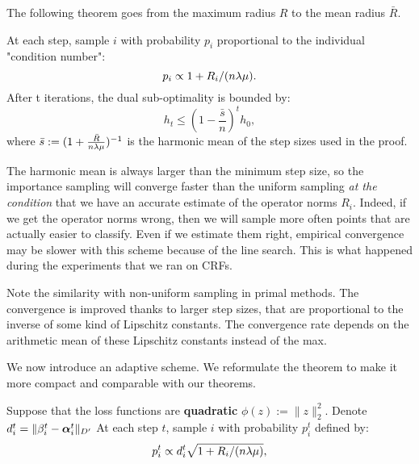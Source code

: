 \begin{subappendices}
	The following theorem goes from the maximum radius $R$ to the mean radius $\bar R$.
	
	\begin{theorem}
		\label{app:importance}
		At each step, sample $i$ with probability $p_i$ proportional to the individual "condition number":
		\begin{equation}
			p_i \propto 1+R_i/(n \lambda \mu).
		\end{equation}
		After t iterations, the dual sub-optimality is bounded by:
		\begin{equation}
			h_t \leq (1-\frac{\bar s}{n})^t  h_0,
		\end{equation}
		where $\bar s := (1 + \frac{\bar R}{n \lambda \mu})^{-1}$ is the harmonic mean of the step sizes used in the proof.
	\end{theorem}
	
	The harmonic mean is always larger than the minimum step size, so the importance sampling will converge faster than the uniform sampling \textit{at the condition} that we have an accurate estimate of the operator norms $R_i$.
	Indeed, if we get the operator norms wrong, then we will sample more often points that are actually easier to classify.
	Even if we estimate them right, empirical convergence may be slower with this scheme because of the line search.
	This is what happened during the experiments that we ran on CRFs.
	
	Note the similarity with non-uniform sampling in primal methods.
	The convergence is improved thanks to larger step sizes, that are proportional to the inverse of some kind of Lipschitz constants.
	The convergence rate depends on the arithmetic mean of these Lipschitz constants instead of the max.
	
	We now introduce an adaptive scheme. We reformulate the theorem to make it more compact and comparable with our theorems.
	
	\begin{theorem}
		\label{app:csiba}
		Suppose that the loss functions are \textbf{quadratic} $\phi(z):=\|z\|_2^2$.
		Denote $d_i^t =  \|\beta_i^t - \boldsymbol{\alpha}_i^t \|_{D'}$
		At each step $t$, sample $i$ with probability $p_i^t$ defined by:
		\begin{equation}
			p_i^t \propto d_i^t \sqrt{1+R_i/(n \lambda \mu)},
		\end{equation}
		

\end{theorem}
\end{subappendices}
